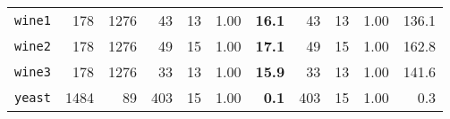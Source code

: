 \begin{tabular}{lccrrrrrrrr}
\texttt{wine1} & \multicolumn{1}{r}{178} & \multicolumn{1}{r}{1276}  & 43 & 13 & 1.00 & \textbf{16.1} & 43 & 13 & 1.00 & 136.1\\
\texttt{wine2} & \multicolumn{1}{r}{178} & \multicolumn{1}{r}{1276}  & 49 & 15 & 1.00 & \textbf{17.1} & 49 & 15 & 1.00 & 162.8\\
\texttt{wine3} & \multicolumn{1}{r}{178} & \multicolumn{1}{r}{1276}  & 33 & 13 & 1.00 & \textbf{15.9} & 33 & 13 & 1.00 & 141.6\\
\texttt{yeast} & \multicolumn{1}{r}{1484} & \multicolumn{1}{r}{89}  & 403 & 15 & 1.00 & \textbf{0.1} & 403 & 15 & 1.00 & 0.3\\
\bottomrule
\end{tabular}
